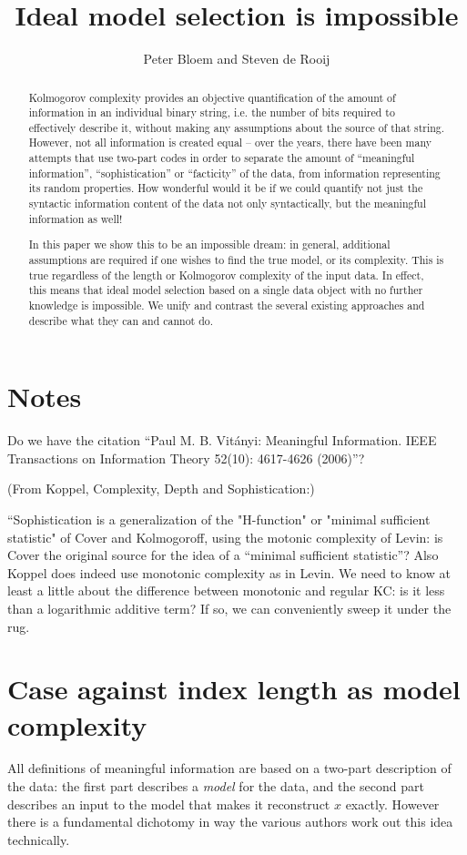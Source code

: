 \documentclass{article}
\title{Ideal model selection is impossible}
\author{Peter Bloem and Steven de Rooij}
\begin{document}
\maketitle

\begin{abstract}
Kolmogorov complexity provides an objective quantification of the amount of information in an individual binary string, i.e. the number of bits required to effectively describe it, without making any assumptions about the source of that string. However, not all information is created equal -- over the years, there have been many attempts that use two-part codes in order to separate the amount of ``meaningful information'', ``sophistication'' or ``facticity'' of the data, from information representing its random properties. How wonderful would it be if we could quantify not just the syntactic information content of the data  not only syntactically, but the meaningful information as well!

In this paper we show this to be an impossible dream: in general, additional assumptions are required if one wishes to find the true model, or its complexity. This is true regardless of the length or Kolmogorov complexity of the input data. In effect, this means that ideal model selection based on a single data object with no further knowledge is impossible. We unify and contrast the several existing approaches and describe what they can and cannot do. 
\end{abstract}

\section{Notes}

Do we have the citation ``Paul M. B. Vit\'anyi: Meaningful Information. IEEE Transactions on Information Theory 52(10): 4617-4626 (2006)''?

(From Koppel, Complexity, Depth and Sophistication:)

``Sophistication is a generalization of the "H-function" or "minimal sufficient statistic" of Cover and Kolmogoroff, using the motonic complexity of Levin: is Cover the original source for the idea of a ``minimal sufficient statistic''? Also Koppel does indeed use monotonic complexity as in Levin. We need to know at least a little about the difference between monotonic and regular KC: is it less than a logarithmic additive term? If so, we can conveniently sweep it under the rug.


\section{Case against index length as model complexity}
All definitions of meaningful information are based on a two-part description of the data: the first part describes a \emph{model} for the data, and the second part describes an input to the model that makes it reconstruct $x$ exactly. However there is a fundamental dichotomy in way the various authors work out this idea technically.
\end{document}
